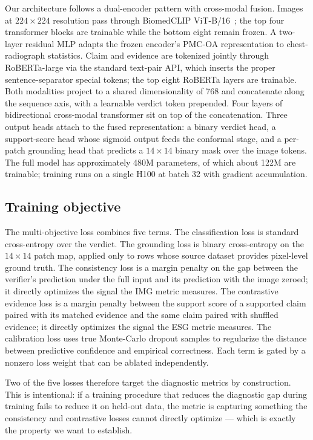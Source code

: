 \documentclass[11pt]{article}
\begin{document}
Our architecture follows a dual-encoder pattern with cross-modal fusion. Images at $224 \times 224$ resolution pass through BiomedCLIP ViT-B/16~\cite{biomedclip}; the top four transformer blocks are trainable while the bottom eight remain frozen. A two-layer residual MLP adapts the frozen encoder's PMC-OA representation to chest-radiograph statistics. Claim and evidence are tokenized jointly through RoBERTa-large via the standard text-pair API, which inserts the proper sentence-separator special tokens; the top eight RoBERTa layers are trainable. Both modalities project to a shared dimensionality of 768 and concatenate along the sequence axis, with a learnable verdict token prepended. Four layers of bidirectional cross-modal transformer sit on top of the concatenation. Three output heads attach to the fused representation: a binary verdict head, a support-score head whose sigmoid output feeds the conformal stage, and a per-patch grounding head that predicts a $14 \times 14$ binary mask over the image tokens. The full model has approximately 480M parameters, of which about 122M are trainable; training runs on a single H100 at batch 32 with gradient accumulation.

\subsection{Training objective}

The multi-objective loss combines five terms. The classification loss is standard cross-entropy over the verdict. The grounding loss is binary cross-entropy on the $14 \times 14$ patch map, applied only to rows whose source dataset provides pixel-level ground truth. The consistency loss is a margin penalty on the gap between the verifier's prediction under the full input and its prediction with the image zeroed; it directly optimizes the signal the IMG metric measures. The contrastive evidence loss is a margin penalty between the support score of a supported claim paired with its matched evidence and the same claim paired with shuffled evidence; it directly optimizes the signal the ESG metric measures. The calibration loss uses true Monte-Carlo dropout samples to regularize the distance between predictive confidence and empirical correctness. Each term is gated by a nonzero loss weight that can be ablated independently.

Two of the five losses therefore target the diagnostic metrics by construction. This is intentional: if a training procedure that reduces the diagnostic gap during training fails to reduce it on held-out data, the metric is capturing something the consistency and contrastive losses cannot directly optimize --- which is exactly the property we want to establish.
\end{document}
